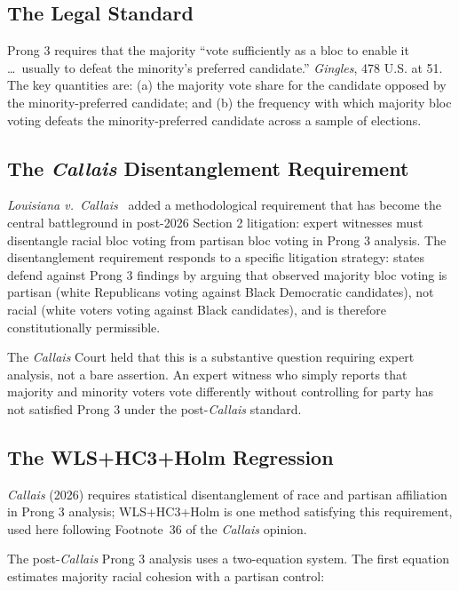 \label{sec:prong3}

\subsection{The Legal Standard}

Prong 3 requires that the majority ``vote sufficiently as a bloc to enable it
\ldots\ usually to defeat the minority's preferred candidate.''  \textit{Gingles},
478 U.S. at 51.  The key quantities are: (a) the majority vote share for the
candidate opposed by the minority-preferred candidate; and (b) the frequency
with which majority bloc voting defeats the minority-preferred candidate
across a sample of elections.

\subsection{The \textit{Callais} Disentanglement Requirement}

\textit{Louisiana v.\ Callais}~\citep{callais2026} added a methodological
requirement that has become the central battleground in post-2026 Section 2
litigation: expert witnesses must disentangle racial bloc voting from partisan
bloc voting in Prong 3 analysis.  The disentanglement requirement responds
to a specific litigation strategy: states defend against Prong 3 findings by
arguing that observed majority bloc voting is partisan (white Republicans
voting against Black Democratic candidates), not racial (white voters voting
against Black candidates), and is therefore constitutionally permissible.

The \textit{Callais} Court held that this is a substantive question requiring
expert analysis, not a bare assertion.  An expert witness who simply reports
that majority and minority voters vote differently without controlling for
party has not satisfied Prong 3 under the post-\textit{Callais} standard.

\subsection{The WLS+HC3+Holm Regression}

\textit{Callais} (2026) requires statistical disentanglement of race and
partisan affiliation in Prong 3 analysis; WLS+HC3+Holm is one method
satisfying this requirement, used here following Footnote~36 of the
\textit{Callais} opinion.

The post-\textit{Callais} Prong 3 analysis uses a two-equation system.
The first equation estimates majority racial cohesion with a partisan control:

